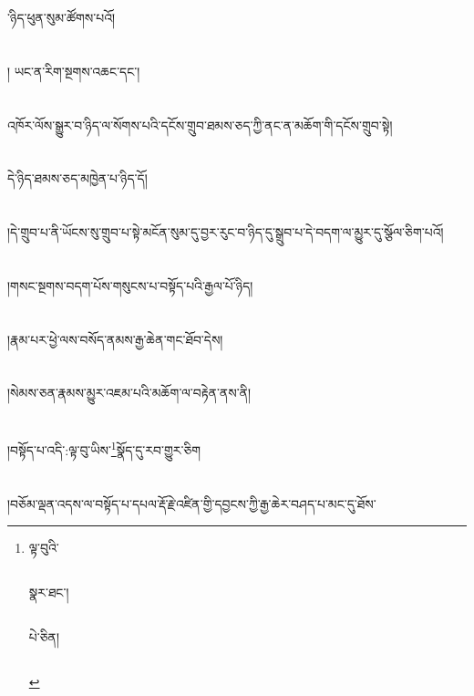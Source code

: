 ་ཉིད་ཕུན་སུམ་ཚོགས་པའོ།\chapter{ }།
ཡང་ན་རིག་སྔགས་འཆང་དང་།\chapter{ }འཁོར་ལོས་སྒྱུར་བ་ཉིད་ལ་སོགས་པའི་དངོས་གྲུབ་ཐམས་ཅད་ཀྱི་ནང་ན་མཆོག་གི་དངོས་གྲུབ་སྟེ།\chapter{ }དེ་ཉིད་ཐམས་ཅད་མཁྱེན་པ་ཉིད་དོ།\chapter{ }།དེ་གྲུབ་པ་ནི་ཡོངས་སུ་གྲུབ་པ་སྟེ་མངོན་སུམ་དུ་བྱར་རུང་བ་ཉིད་དུ་སྒྲུབ་པ་དེ་བདག་ལ་མྱུར་དུ་སྩོལ་ཅིག་པའོ།\chapter{ }།གསང་སྔགས་བདག་པོས་གསུངས་པ་བསྟོད་པའི་རྒྱལ་པོ་ཉིད།\chapter{ }།རྣམ་པར་ཕྱེ་ལས་བསོད་ནམས་རྒྱ་ཆེན་གང་ཐོབ་དེས།\chapter{ }།སེམས་ཅན་རྣམས་མྱུར་འཇམ་པའི་མཆོག་ལ་བརྟེན་ནས་ནི།\chapter{ }།བསྟོད་པ་འདི་:ལྟ་བུ་ཡིས་\footnote{ལྟ་བུའི་\chapter{ }\chapter{ }སྣར་ཐང་།\chapter{ }\chapter{ }པེ་ཅིན།\chapter{ }}སྣོད་དུ་རབ་གྱུར་ཅིག\chapter{ }།བཅོམ་ལྡན་འདས་ལ་བསྟོད་པ་དཔལ་རྡོ་རྗེ་འཛིན་གྱི་དབྱངས་ཀྱི་རྒྱ་ཆེར་བཤད་པ་མང་དུ་ཐོས་